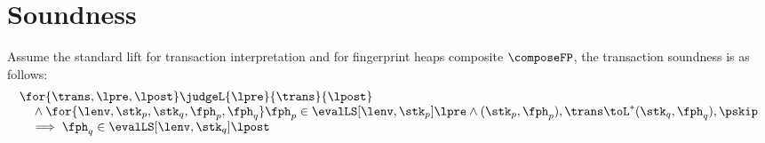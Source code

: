 \section{Soundness}


\begin{thm}
\label{thm:transaction-soundness}
Assume the standard lift for transaction interpretation and for fingerprint heaps composite \( \composeFP \), the transaction soundness is as follows:
\[
    \begin{array}{@{}l@{}}
        \for{ \trans, \lpre, \lpost } 
        \judgeL{\lpre}{\trans}{\lpost} \\
        \quad {} \land \for{\lenv, \stk_{p}, \stk_{q}, \fph_{p}, \fph_{q} } 
        \fph_{p} \in \evalLS[\lenv, \stk_{p}]{\lpre}
        \land (\stk_{p}, \fph_{p} ), \trans \toL^{*}  (\stk_{q}, \fph_{q} ), \pskip \\
        \quad \implies \fph_{q} \in \evalLS[\lenv, \stk_{q}]{\lpost}
    \end{array}
\]
\end{thm}
